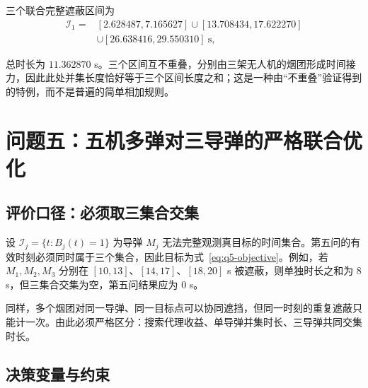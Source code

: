 \documentclass[12pt,a4paper]{article}
\begin{document}
\begin{table}[H]
\centering
\caption{问题四三机协同策略}
\label{tab:q4-result}
\end{table}

三个联合完整遮蔽区间为
\begin{equation}
\begin{aligned}
\mathcal I_1={}&[2.628487,7.165627]\cup[13.708434,17.622270]\\
&\cup[26.638416,29.550310]\ \mathrm{s},
\end{aligned}
\end{equation}

总时长为 $11.362870$ s。三个区间互不重叠，分别由三架无人机的烟团形成时间接力，因此此处并集长度恰好等于三个区间长度之和；这是一种由“不重叠”验证得到的特例，而不是普遍的简单相加规则。

\section{问题五：五机多弹对三导弹的严格联合优化}

\subsection{评价口径：必须取三集合交集}

设 $\mathcal I_j=\{t:B_j(t)=1\}$ 为导弹 $M_j$ 无法完整观测真目标的时间集合。第五问的有效时刻必须同时属于三个集合，因此目标为式~\eqref{eq:q5-objective}。例如，若 $M_1,M_2,M_3$ 分别在 $[10,13]$、$[14,17]$、$[18,20]$ s 被遮蔽，则单独时长之和为 $8$ s，但三集合交集为空，第五问结果应为 $0$ s。

同样，多个烟团对同一导弹、同一目标点可以协同遮挡，但同一时刻的重复遮蔽只能计一次。由此必须严格区分：搜索代理收益、单导弹并集时长、三导弹共同交集时长。

\subsection{决策变量与约束}
\end{document}
